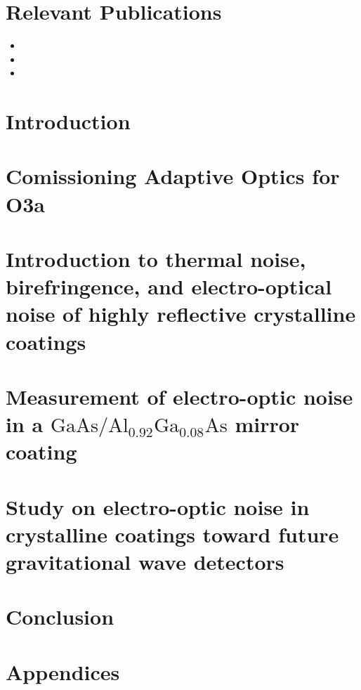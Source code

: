 \documentclass[12pt]{report}
\newif\ifswitch
\newcommand{\algaas}{\mathrm{Al_{0.92}Ga_{0.08}As}}
\newcommand{\gaas}{\mathrm{GaAs}}
\begin{document}
\tableofcontents

\ifswitch
    \nobibliography*
    \chapter*{Relevant Publications}
    \begin{itemize}
        \item {}
        \item {}
        \item {}
    \end{itemize}

\chapter{Introduction}
\fancyhf{}
\fancyhead[R]{\makebox[0pt][l]{\makebox[2.5cm][r]{\thepage}}}
\setlength{\headheight}{27.85004pt}



\newpage

\chapter{Comissioning Adaptive Optics for O3a}

\newpage

\chapter{Introduction to thermal noise, birefringence, and electro-optical noise of highly reflective crystalline coatings}

\newpage 

\chapter{Measurement of electro-optic noise in a \texorpdfstring{$\gaas / \algaas$}{gaas/algaas} mirror coating}

\newpage

\chapter{Study on electro-optic noise in crystalline coatings toward future gravitational wave detectors}

\newpage 

\chapter{Conclusion}

\newpage

\chapter*{Appendices} 






\end{document}
